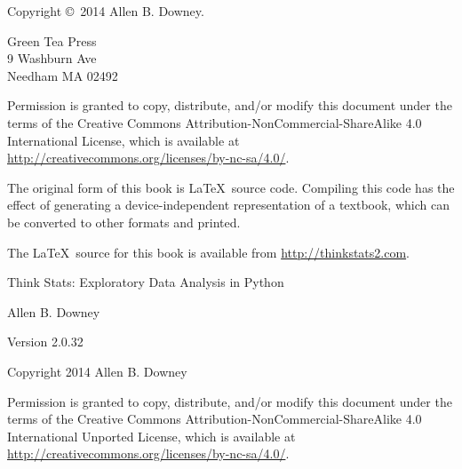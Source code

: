 \documentclass[12pt]{book}
\newcommand{\thetitle}{Think Stats}
\newcommand{\thesubtitle}{Exploratory Data Analysis in Python}
\newcommand{\theversion}{2.0.32}
\begin{document}
\begin{latexonly}
\begin{flushright}
\end{flushright}


\pagebreak
\thispagestyle{empty}

{\small
Copyright \copyright ~2014 Allen B. Downey.


\vspace{0.2in}

\begin{flushleft}
Green Tea Press       \\
9 Washburn Ave \\
Needham MA 02492
\end{flushleft}

Permission is granted to copy, distribute, and/or modify this document
under the terms of the Creative Commons
Attribution-NonCommercial-ShareAlike 4.0 International License, which
is available at
\url{http://creativecommons.org/licenses/by-nc-sa/4.0/}.

The original form of this book is \LaTeX\ source code.  Compiling this
code has the effect of generating a device-independent representation
of a textbook, which can be converted to other formats and printed.

The \LaTeX\ source for this book is available from
\url{http://thinkstats2.com}.

\vspace{0.2in}

} %

\end{latexonly}



\begin{htmlonly}


{\Large \thetitle: \thesubtitle}

{\large Allen B. Downey}

Version \theversion

\vspace{0.25in}

Copyright 2014 Allen B. Downey

\vspace{0.25in}

Permission is granted to copy, distribute, and/or modify this document
under the terms of the Creative Commons 
Attribution-NonCommercial-ShareAlike 4.0 International
Unported License, which is available at
\url{http://creativecommons.org/licenses/by-nc-sa/4.0/}.

\setcounter{chapter}{-1}

\end{htmlonly}
\end{document}
